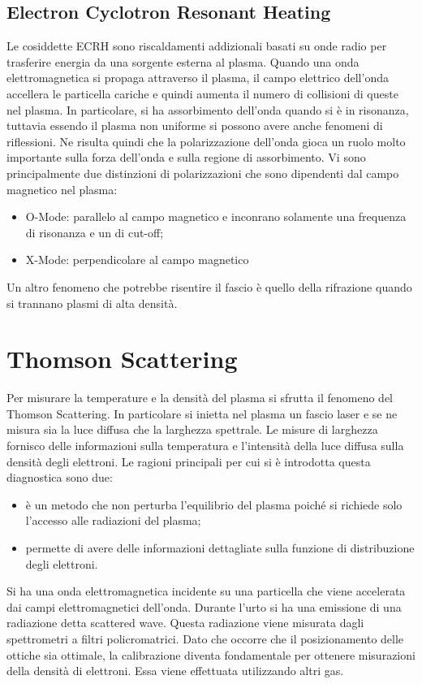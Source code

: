 \documentclass{article}
\begin{document}
\subsection{Electron Cyclotron Resonant Heating}
Le cosiddette ECRH sono riscaldamenti addizionali basati su onde radio per trasferire energia da una sorgente esterna al plasma. Quando una onda elettromagnetica si propaga attraverso il plasma, il campo elettrico dell'onda accellera le particella cariche e quindi aumenta il numero di collisioni di queste nel plasma.\newline
In particolare, si ha assorbimento dell'onda quando si è in risonanza, tuttavia essendo il plasma non uniforme si possono avere anche fenomeni di riflessioni. Ne risulta quindi che la polarizzazione dell'onda gioca un ruolo molto importante sulla forza dell'onda e sulla regione di assorbimento. Vi sono principalmente due distinzioni di polarizzazioni che sono dipendenti dal campo magnetico nel plasma:\begin{itemize}
    \item O-Mode: parallelo al campo magnetico e inconrano solamente una frequenza di risonanza e un di cut-off;
    \item X-Mode: perpendicolare al campo magnetico
\end{itemize}
Un altro fenomeno che potrebbe risentire il fascio è quello della rifrazione quando si trannano plasmi di alta densità.
\section{Thomson Scattering}
Per misurare la temperature e la densità del plasma si sfrutta il fenomeno del Thomson Scattering. In particolare si inietta nel plasma un fascio laser e se ne misura sia la luce diffusa che la larghezza spettrale.\newline
Le misure di larghezza fornisco delle informazioni sulla temperatura e l'intensità della luce diffusa sulla densità degli elettroni. Le ragioni principali per cui si è introdotta questa diagnostica sono due:\begin{itemize}
    \item è un metodo che non perturba l'equilibrio del plasma poiché si richiede solo l'accesso alle radiazioni del plasma;
    \item permette di avere delle informazioni dettagliate sulla funzione di distribuzione degli elettroni.
\end{itemize}
Si ha una onda elettromagnetica incidente su una particella che viene accelerata dai campi elettromagnetici dell'onda. Durante l'urto si ha una emissione di una radiazione detta scattered wave. Questa radiazione viene misurata dagli spettrometri a filtri policromatrici.
Dato che occorre che il posizionamento delle ottiche sia ottimale, la calibrazione diventa fondamentale per ottenere misurazioni della densità di elettroni. Essa viene effettuata utilizzando altri gas.
\end{document}
